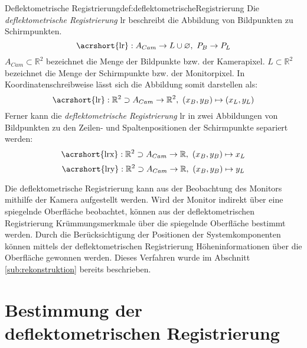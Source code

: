 \begin{Definition}{Deflektometrische Registrierung}{def:deflektometrischeRegistrierung}
	Die \textit{deflektometrische Registrierung} \acrshort{lr} beschreibt die Abbildung von Bildpunkten zu Schirmpunkten. \cite{kit_sbw}
	\begin{equation}
		\text{\acrshort{lr}} : A_{Cam} \rightarrow L \cup \varnothing ,~ P_{B} \rightarrow P_{L}
	\end{equation}
	$ A_{Cam} \subset \mathbb{R}^{2} $ bezeichnet die Menge der Bildpunkte bzw. der Kamerapixel.
	$ L \subset \mathbb{R}^{2} $ bezeichnet die Menge der Schirmpunkte bzw. der Monitorpixel.
	In Koordinatenschreibweise lässt sich die Abbildung somit darstellen als:
	\begin{equation}
		\text{\acrshort{lr}} : \mathbb{R}^{2} \supset A_{Cam} \rightarrow \mathbb{R}^2 ,~ (x_{B}, y_{B}) \mapsto (x_{L}, y_{L})
	\end{equation}
	Ferner kann die \textit{deflektometrische Registrierung} \acrshort{lr} in zwei Abbildungen von Bildpunkten zu den Zeilen- und Spaltenpositionen der Schirmpunkte separiert werden:
	\begin{equation}
		\text{\acrshort{lrx}} : \mathbb{R}^{2} \supset A_{Cam} \rightarrow \mathbb{R} ,~ (x_{B}, y_{B}) \mapsto x_{L}
	\end{equation}
	\begin{equation}
		\text{\acrshort{lry}} : \mathbb{R}^{2} \supset A_{Cam} \rightarrow \mathbb{R} ,~ (x_{B}, y_{B}) \mapsto y_{L}
	\end{equation}
\end{Definition}

\noindent
Die deflektometrische Registrierung kann aus der Beobachtung des Monitors mithilfe der Kamera aufgestellt werden.
Wird der Monitor indirekt über eine spiegelnde Oberfläche beobachtet, können aus der deflektometrischen Registrierung Krümmungsmerkmale über die spiegelnde Oberfläche bestimmt werden.
Durch die Berücksichtigung der Positionen der Systemkomponenten können mittels der deflektometrischen Registrierung Höheninformationen über die Oberfläche gewonnen werden.
Dieses Verfahren wurde im Abschnitt \ref{sub:rekonstruktion} bereits beschrieben.

{
	\FloatBarrier
    \section{Bestimmung der deflektometrischen Registrierung}
    \label{sec:bestimmungDeflektometrischeRegistrierung}
    
}